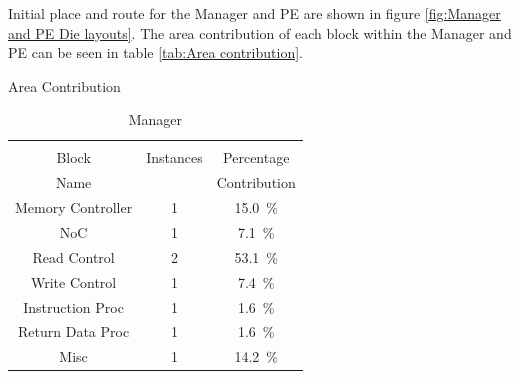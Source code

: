 \documentclass[journal]{IEEEtran}
\begin{document}
Initial place and route for the Manager and PE are shown in figure \ref{fig:Manager and PE Die layouts}. 
The area contribution of each block within the Manager and PE can be seen in table \ref{tab:Area contribution}.
\begin{table}[h]
  \captionsetup{justification=centering, skip=3pt}
  \caption{Area Contribution}
  \vspace{3pt}
  \label{tab:Area contribution}
  \centering
  \begin{subtable}{0.5\textwidth}
    \centering
    \begin{adjustbox}{width=0.75\textwidth}
      \begin{tabular}{ccc}
        \toprule
                         &          &                                         \\  %
            Block        &Instances &Percentage                               \\  %
            Name         &          &Contribution                             \\  %
        \hline  %
  Memory Controller      & 1&\SI[per-mode=symbol]{15.0}{\percent}  \\ 
        NoC              & 1&\SI[per-mode=symbol]{ 7.1}{\percent}  \\
        Read Control     & 2&\SI[per-mode=symbol]{53.1}{\percent}  \\
        Write Control    & 1&\SI[per-mode=symbol]{ 7.4}{\percent}  \\
      Instruction Proc   & 1&\SI[per-mode=symbol]{ 1.6}{\percent}  \\
      Return Data Proc   & 1&\SI[per-mode=symbol]{ 1.6}{\percent}  \\
        Misc             & 1&\SI[per-mode=symbol]{14.2}{\percent}  \\
        \bottomrule
      \end{tabular}
    \end{adjustbox}
    \vspace{3pt}
    \captionsetup{justification=centering, skip=10pt}
    \caption{Manager}
    \label{tab:Manager Area Contribution}
  \end{subtable}

\end{table}
\end{document}

